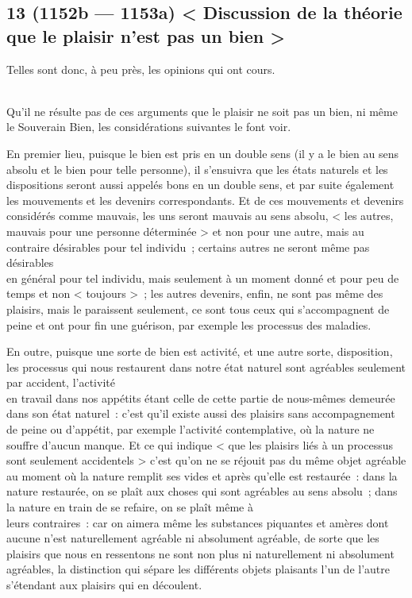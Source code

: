 \documentclass[french,twoside]{book} %
\begin{document}
\subsection[{13 (1152b — 1153a) < Discussion de la théorie que le plaisir n’est pas un bien >}]{13 (1152b — 1153a) < Discussion de la théorie que le plaisir n’est pas un bien >}
\noindent Telles sont donc, à peu près, les opinions qui ont cours.\par
\\
Qu’il ne résulte pas de ces arguments que le plaisir ne soit pas un bien, ni même le Souverain Bien, les considérations suivantes le font voir.\par
En premier lieu, puisque le bien est pris en un double sens (il y a le bien au sens absolu et le bien pour telle personne), il s’ensuivra que les états naturels et les dispositions seront aussi appelés bons en un double sens, et par suite également les mouvements et les devenirs correspondants. Et de ces mouvements et devenirs considérés comme mauvais, les uns seront mauvais au sens absolu, < les autres, mauvais pour une personne déterminée > et non pour une autre, mais au contraire désirables pour tel individu ; certains autres ne seront même pas désirables \\
en général pour tel individu, mais seulement à un moment donné et pour peu de temps et non < toujours > ; les autres devenirs, enfin, ne sont pas même des plaisirs, mais le paraissent seulement, ce sont tous ceux qui s’accompagnent de peine et ont pour fin une guérison, par exemple les processus des maladies.\par
En outre, puisque une sorte de bien est activité, et une autre sorte, disposition, les processus qui nous restaurent dans notre état naturel sont agréables seulement par accident, l’activité \\
en travail dans nos appétits étant celle de cette partie de nous-mêmes demeurée dans son état naturel : c’est qu’il existe  aussi des plaisirs sans accompagnement de peine ou d’appétit, par exemple l’activité contemplative, où la nature ne souffre d’aucun manque. Et ce qui indique < que les plaisirs liés à un processus sont seulement accidentels > c’est qu’on ne se réjouit pas du même objet agréable au moment où la nature remplit ses vides et après qu’elle est restaurée : dans la nature restaurée, on se plaît aux choses qui sont agréables au sens absolu ; dans la nature en train de se refaire, on se plaît même à \\
leurs contraires : car on aimera même les substances piquantes et amères dont aucune n’est naturellement agréable ni absolument agréable, de sorte que les plaisirs que nous en ressentons ne sont non plus ni naturellement ni absolument agréables, la distinction qui sépare les différents objets plaisants l’un de l’autre s’étendant aux plaisirs qui en découlent.\par
\end{document}
